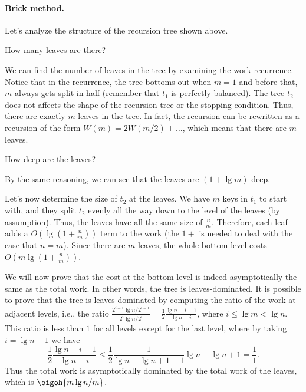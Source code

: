\paragraph{Brick method.}
Let's analyze the structure of the recursion tree shown above.
%
\begin{question}
How many leaves are there?
\end{question}
%
We can find the number of leaves in the tree by examining the work
recurrence.  Notice that in the recurrence, the tree bottoms out when
$m = 1$ and before that, $m$ always gets split in half (remember that
$t_1$ is perfectly balanced).  The tree $t_2$ does not affects the
shape of the recursion tree or the stopping condition. Thus, there are
exactly $m$ leaves in the tree.  
%
In fact, the recursion can be rewritten as a recursion of the form
$W(m) = 2W(m/2) + \ldots $, which means that there are $m$ leaves.
%
\begin{question}
How deep are the leaves?
\end{question}
%
By the same reasoning, we can see that the leaves are $(1 + \lg m)$
deep.

Let's now determine the size of $t_2$ at the leaves.  
%
We have $m$ keys in $t_1$ to start with, and they split $t_2$ evenly
all the way down to the level of the leaves (by assumption). Thus, the
leaves have all the same size of $\frac{n}{m}$.
%
Therefore, each leaf adds a $O(\lg (1+\frac{n}{m}))$ term to the work
(the $1+$ is needed to deal with the case that $n = m$).  Since there
are $m$ leaves, the whole bottom level costs $O(m \lg (1+
\frac{n}{m}))$.  

We will now prove that the cost at the bottom level is indeed
asymptotically the same as the total work.  In other words, the tree
is leaves-dominated.  It is possible to prove that the tree is
leaves-dominated by computing the ratio of the work at adjacent
levels, i.e., the ratio $\frac{2^{i-1}  \lg{n/2^{i-1}}}{2^i 
  \lg{n/2^{i}}} = \frac{1}{2} \frac{\lg{n} - i + 1 }{\lg{n} - i}$,
where $i \le \lg{m} < \lg{n}$. This ratio is less than $1$ for all
levels except for the last level, where by taking $i = \lg{n} - 1$ we
have
\[
 \frac{1}{2} \frac{\lg{n} - i +1 }{\lg{n} - i}
 \le
 \frac{1}{2} \frac{1}{\lg{n} - \lg{n} +1 + 1}{\lg{n} - \lg{n}+1}
= \frac{1}{1}.
\]
Thus the total work is asymptotically dominated by the total work of
the leaves, which is $\bigoh{m\lg{n/m}}$.


